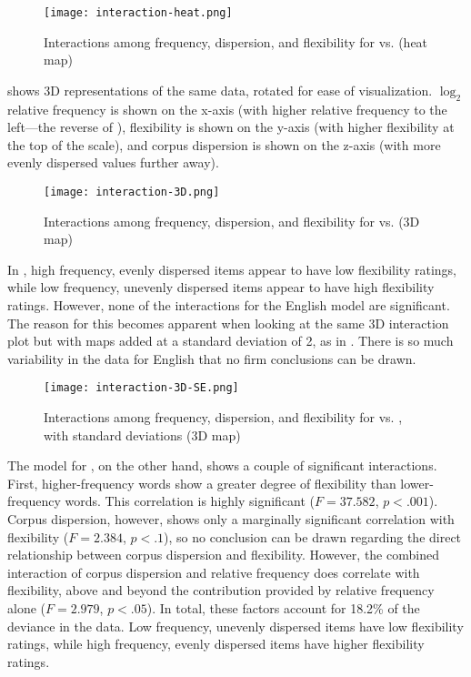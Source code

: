 \begin{figure}
  \centering
  \caption{Interactions among frequency, dispersion, and flexibility for  vs.  (heat map)}
  \label{fig:interaction-heat}
  \texttt{[image: interaction-heat.png]}
\end{figure}

 shows 3D representations of the same data, rotated for ease of visualization. $\log_2$ relative frequency is shown on the x-axis (with higher relative frequency to the left—the reverse of ), flexibility is shown on the y-axis (with higher flexibility at the top of the scale), and corpus dispersion is shown on the z-axis (with more evenly dispersed values further away).

\begin{figure}
  \centering
  \caption{Interactions among frequency, dispersion, and flexibility for  vs.  (3D map)}
  \label{fig:interaction-3D}
  \texttt{[image: interaction-3D.png]}
\end{figure}

In , high frequency, evenly dispersed items appear to have low flexibility ratings, while low frequency, unevenly dispersed items appear to have high flexibility ratings. However, none of the interactions for the English model are significant. The reason for this becomes apparent when looking at the same 3D interaction plot but with maps added at a standard deviation of 2, as in . There is so much variability in the data for English that no firm conclusions can be drawn.

\begin{figure}
  \centering
  \caption{Interactions among frequency, dispersion, and flexibility for  vs. , with standard deviations (3D map)}
  \label{fig:interaction-3D-SD}
  \texttt{[image: interaction-3D-SE.png]}
\end{figure}

The model for , on the other hand, shows a couple of significant interactions. First, higher-frequency words show a greater degree of flexibility than lower-frequency words. This correlation is highly significant ($F = 37.582$, $p < .001$). Corpus dispersion, however, shows only a marginally significant correlation with flexibility ($F = 2.384$, $p < .1$), so no conclusion can be drawn regarding the direct relationship between corpus dispersion and flexibility. However, the combined interaction of corpus dispersion and relative frequency does correlate with flexibility, above and beyond the contribution provided by relative frequency alone ($F = 2.979$, $p < .05$). In total, these factors account for 18.2\% of the deviance in the data. Low frequency, unevenly dispersed items have low flexibility ratings, while high frequency, evenly dispersed items have higher flexibility ratings.

